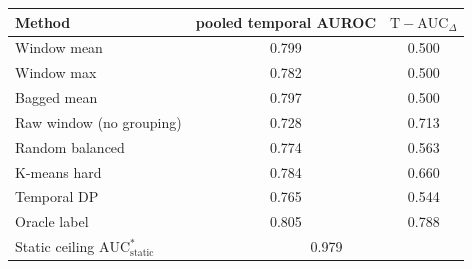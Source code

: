 \begin{tabular}{lcc}
\toprule
Method & pooled temporal AUROC & $\mathrm{T\!-\!AUC}_{\Delta}$ \\
\midrule
Window mean & 0.799 & 0.500 \\
Window max & 0.782 & 0.500 \\
Bagged mean & 0.797 & 0.500 \\
Raw window (no grouping) & 0.728 & 0.713 \\
Random balanced & 0.774 & 0.563 \\
K-means hard & 0.784 & 0.660 \\
Temporal DP & 0.765 & 0.544 \\
Oracle label & 0.805 & 0.788 \\
\midrule
Static ceiling $\mathrm{AUC}^*_{\mathrm{static}}$ & \multicolumn{2}{c}{0.979} \\
\bottomrule
\end{tabular}
